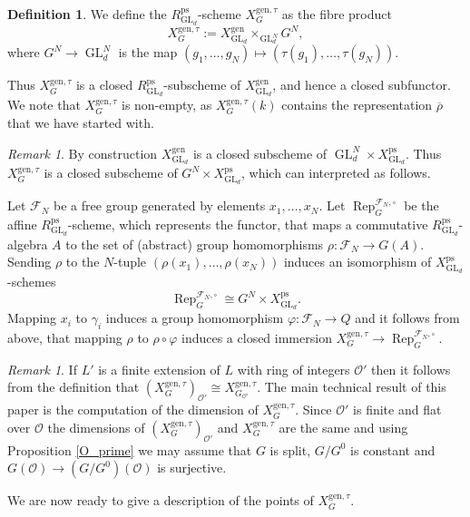 \documentclass{amsart}
\theoremstyle{definition}
\newtheorem{defi}[prop]{Definition}
\theoremstyle{remark}
\newtheorem{remar}[prop]{Remark}
\DeclareMathOperator{\GL}{GL}
\DeclareMathOperator{\Rep}{Rep}
\newcommand{\OO}{\mathcal O}
\newcommand{\rhobar}{\overline{\rho}}
\newcommand{\ps}{\mathrm{ps}}
\newcommand{\gen}{\mathrm{gen}}
\newcommand{\RpsGLd}{R^{\ps}_{\GL_d}}
\newcommand{\XgenGLd}{X^{\gen}_{\GL_d}}
\newcommand{\XpsGLd}{X^{\ps}_{\GL_d}}
\newcommand{\XgenGtau}{X^{\gen, \tau}_G}
\begin{document}
\begin{defi}\label{defiXgenG}
We define the $\RpsGLd$-scheme $\XgenGtau$ as the fibre product 
\begin{equation}\label{def_XgenG}
\XgenGtau := \XgenGLd\times_{\GL_d^N} G^N,
\end{equation}
where $G^N \rightarrow \GL_d^N$ is the map $(g_1, \ldots, g_N)\mapsto (\tau(g_1),\ldots, \tau(g_N))$.    
\end{defi}

Thus $\XgenGtau$ is a closed $\RpsGLd$-subscheme of $\XgenGLd$, and hence a 
closed subfunctor.
We note that $\XgenGtau$ is non-empty, as $\XgenGtau(k)$ contains
the representation $\rhobar$ that we have started with.
\begin{remar}\label{FN} By construction $\XgenGLd$ is a closed subscheme of $\GL_d^N \times \XpsGLd$. Thus $\XgenGtau$ is a closed subscheme of $G^N\times \XpsGLd$, which can interpreted as follows. 

Let $\mathcal F_N$ be a free group generated by elements $x_1, \ldots, x_N$. 
Let $\Rep_G^{\mathcal F_N, \square}$ be the affine $\RpsGLd$-scheme, which represents the functor, that maps a commutative $\RpsGLd$-algebra 
$A$ to the set of (abstract) group homomorphisms $\rho : \mathcal F_N \to G(A)$. Sending $\rho$ to the $N$-tuple
$(\rho(x_1), \ldots, \rho(x_N))$ induces an isomorphism of $\XpsGLd$-schemes 
$$\Rep_G^{\mathcal F_N, \square} \cong G^N\times \XpsGLd.$$ Mapping $x_i$ to $\gamma_i$ induces 
a group homomorphism $\varphi:\mathcal F_N\rightarrow Q$ and it follows from above, that mapping $\rho$ to $\rho\circ \varphi$ induces a closed immersion $\XgenGtau \rightarrow \Rep_G^{\mathcal F_N, \square}$.
\end{remar}

\begin{remar}\label{rem_extend_scalars} If $L'$ is a finite extension of $L$ with ring of integers $\OO'$ then it follows 
from the definition that $(\XgenGtau)_{\OO'}\cong X^{\gen, \tau}_{G_{\OO'}}$. 
The main technical result of this paper is the computation of the dimension of $\XgenGtau$. 
Since $\OO'$ is finite and flat over $\OO$ the dimensions of $(\XgenGtau)_{\OO'}$ and $\XgenGtau$
are the same and using Proposition \ref{O_prime} we may assume that $G$ is split, $G/G^0$ is constant 
and $G(\OO)\rightarrow (G/G^0)(\OO)$ is surjective. 
\end{remar}



We are now ready to give a description of the points of $\XgenGtau$.
\end{document}

